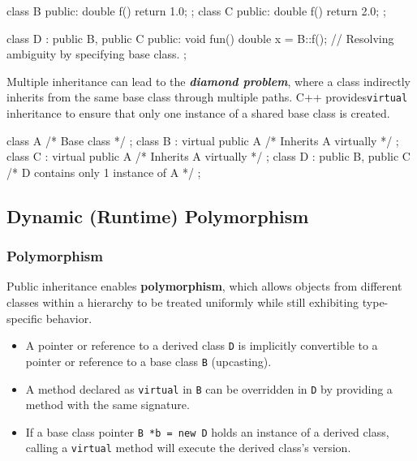 \begin{codeblock}[language=C++, numbers=none]
class B { public: double f() { return 1.0; } };
class C { public: double f() { return 2.0; } };

class D : public B, public C {
public:
    void fun() {
        double x = B::f(); // Resolving ambiguity by specifying base class.
    }
};
\end{codeblock}

Multiple inheritance can lead to the \textit{\textbf{diamond problem}}, where a class indirectly inherits from the same base class through multiple paths. C++ provides\texttt{virtual} inheritance to ensure that only one instance of a shared base class is created.

\begin{codeblock}[language=C++, numbers=none]
class A { /* Base class */ };
class B : virtual public A { /* Inherits A virtually */ };
class C : virtual public A { /* Inherits A virtually */ };
class D : public B, public C { /* D contains only 1 instance of A */ };
\end{codeblock}

\subsection{Dynamic (Runtime) Polymorphism}

\subsubsection{Polymorphism}

Public inheritance enables \textbf{polymorphism}, which allows objects from different classes within a hierarchy to be treated uniformly while still exhibiting type-specific behavior.

\begin{itemize}
    \item A pointer or reference to a derived class \texttt{D} is implicitly convertible to a pointer or reference to a base class \texttt{B} (upcasting).
    \item A method declared as \texttt{virtual} in \texttt{B} can be overridden in \texttt{D} by providing a method with the same signature.
    \item If a base class pointer \texttt{B *b = new D} holds an instance of a derived class, calling a \texttt{virtual} method will execute the derived class's version.
\end{itemize}

